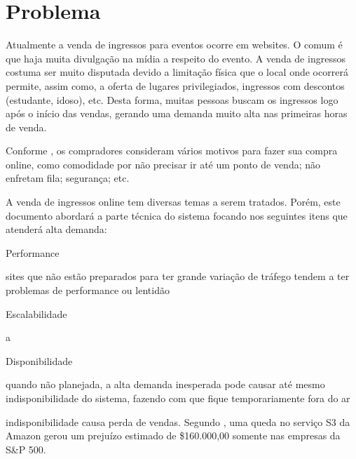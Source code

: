 \chapter{Problema}

Atualmente a venda de ingressos para eventos ocorre em websites.
O comum é que haja muita divulgação na mídia a respeito do evento.
A venda de ingressos costuma ser muito disputada devido a limitação
física que o local onde ocorrerá permite, assim como, a oferta de
lugares privilegiados, ingressos com descontos (estudante, idoso), etc.
Desta forma, muitas pessoas buscam os ingressos logo após o início das
vendas, gerando uma demanda muito alta nas primeiras horas de venda.

Conforme \cite{10-motivos-para-vender-online}, os compradores consideram
vários motivos para fazer sua compra online, como comodidade por não
precisar ir até um ponto de venda; não enfretam fila; segurança; etc.

A venda de ingressos online
tem diversas temas a serem tratados. Porém, este documento abordará a parte
técnica do sistema focando nos seguintes itens que atenderá alta demanda:

\begin{alineas}

  \item Performance

  \begin{alineas}
     \item sites que não estão preparados para ter grande variação de tráfego
           tendem a ter problemas de performance ou lentidão
  \end{alineas}

  \item Escalabilidade

  \begin{alineas}
     \item a
  \end{alineas}

  \item Disponibilidade

  \begin{alineas}
     \item quando não planejada, a alta demanda inesperada pode causar até mesmo
           indisponibilidade do sistema, fazendo com que fique temporariamente
           fora do ar
     \item indisponibilidade causa perda de vendas. Segundo
           \cite{disponibilidade-downtime-perdas}, uma queda no serviço S3 da
           Amazon gerou um prejuízo estimado de \$160.000,00 somente nas empresas
           da S\&P 500.
  \end{alineas}

\end{alineas}
